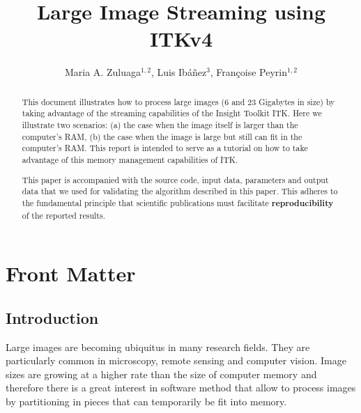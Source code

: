 \documentclass{InsightArticle}
\title{Large Image Streaming using ITKv4}
\author{Maria A. Zuluaga$^{1,2}$, Luis Ib\'{a}\~{n}ez$^{3}$, Fran\c{c}oise Peyrin$^{1,2}$}
\newcommand{\IJhandlerIDnumber}{3263}
\begin{document}
%
%
\IJhandlefooter{\IJhandlerIDnumber}


\ifpdf
\else
\fi


\maketitle


\ifhtml
\chapter*{Front Matter\label{front}}
\fi


\begin{abstract}
\noindent
This document illustrates how to process large images (6 and 23 Gigabytes in
size) by taking advantage of the streaming capabilities of the Insight Toolkit
ITK.  Here we illustrate two scenarios: (a) the case when the image itself is
larger than the computer's RAM, (b) the case when the image is large but still
can fit in the computer's RAM. This report is intended to serve as a tutorial
on how to take advantage of this memory management capabilities of ITK.

This paper is accompanied with the source code, input data, parameters and
output data that we used for validating the algorithm described in this paper.
This adheres to the fundamental principle that scientific publications must
facilitate \textbf{reproducibility} of the reported results.
\end{abstract}

\tableofcontents

\section{Introduction}

Large images are becoming ubiquitus in many research fields. They are
particularly common in microscopy, remote sensing and computer vision.  Image
sizes are growing at a higher rate than the size of computer memory and
therefore there is a great interest in software method that allow to process
images by partitioning in pieces that can temporarily be fit into memory.
\end{document}
